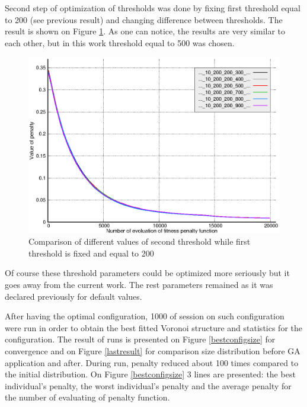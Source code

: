 \documentclass[12pt]{report}
\begin{document}
Second step of optimization of thresholds was done by fixing first threshold equal to 200 (see previous result) and changing difference between thresholds. The result is shown on Figure \ref{threshold2comparison}. As one can notice, the results are very similar to each other, but in this work threshold equal to 500 was chosen.

\begin{figure}
    \centering
    \includegraphics[width=5.0in]{threshold2_comparison}
    \caption{Comparison of different values of second threshold while first threshold is fixed and equal to 200}
    \label{threshold2comparison}
\end{figure}

Of course these threshold parameters could be optimized more seriously but it goes away from the current work. The rest parameters remained as it was declared previously for default values.

After having the optimal configuration, 1000 of session on such configuration were run in order to obtain the best fitted Voronoi structure and statistics for the configuration. The result of runs is presented on Figure \ref{bestconfigsize} for convergence and on Figure \ref{lastresult} for comparison size distribution before GA application and after. During run, penalty reduced about 100 times compared to the initial distribution.
On Figure \ref{bestconfigsize} 3 lines are presented: the best individual's penalty, the worst individual's penalty and the average penalty for the number of evaluating of penalty function.
\end{document}
